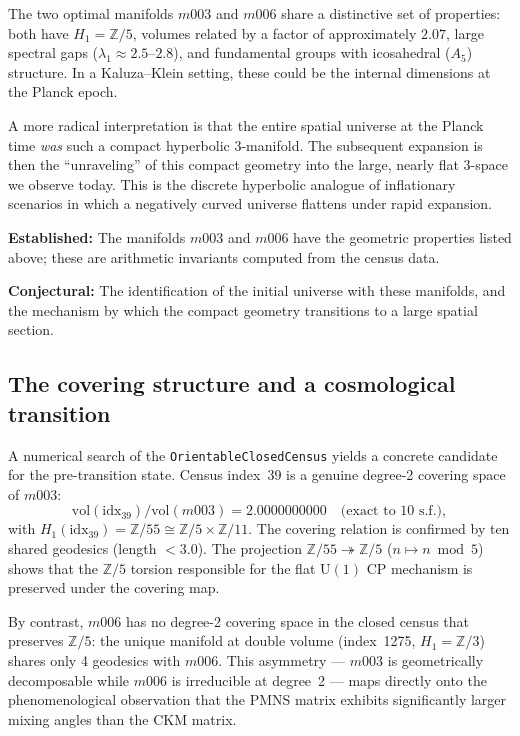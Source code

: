 \documentclass[12pt]{article}
\theoremstyle{definition}
\begin{document}
The two optimal manifolds $m003$ and $m006$ share a distinctive set
of properties: both have $H_1 = \mathbb{Z}/5$, volumes related by
a factor of approximately $2.07$, large spectral gaps
($\lambda_1 \approx 2.5$--$2.8$), and fundamental groups with
icosahedral ($A_5$) structure. In a Kaluza--Klein setting, these
could be the internal dimensions at the Planck epoch.

A more radical interpretation is that the entire spatial universe at
the Planck time \emph{was} such a compact hyperbolic 3-manifold. The
subsequent expansion is then the ``unraveling'' of this compact
geometry into the large, nearly flat 3-space we observe today. This
is the discrete hyperbolic analogue of inflationary scenarios in which
a negatively curved universe flattens under rapid expansion.

\textbf{Established:} The manifolds $m003$ and $m006$ have the
geometric properties listed above; these are arithmetic invariants
computed from the census data.

\textbf{Conjectural:} The identification of the initial universe with
these manifolds, and the mechanism by which the compact geometry
transitions to a large spatial section.

\subsection{The covering structure and a cosmological transition}
\label{sec:cover_cosm}

A numerical search of the \texttt{OrientableClosedCensus} yields
a concrete candidate for the pre-transition state. Census index~39
is a genuine degree-2 covering space of $m003$:
\[
  \mathrm{vol}(\text{idx}_{39}) / \mathrm{vol}(m003)
  = 2.0000000000 \quad \text{(exact to 10 s.f.)},
\]
with $H_1(\text{idx}_{39}) = \mathbb{Z}/55 \cong \mathbb{Z}/5
\times \mathbb{Z}/11$. The covering relation is confirmed by ten
shared geodesics (length $< 3.0$). The projection
$\mathbb{Z}/55 \twoheadrightarrow \mathbb{Z}/5$ ($n \mapsto n
\bmod 5$) shows that the $\mathbb{Z}/5$ torsion responsible for the
flat $\mathrm{U}(1)$ CP mechanism is preserved under the covering map.

By contrast, $m006$ has no degree-2 covering space in the closed
census that preserves $\mathbb{Z}/5$: the unique manifold at double
volume (index~1275, $H_1 = \mathbb{Z}/3$) shares only 4 geodesics with $m006$. This asymmetry --- $m003$ is geometrically
decomposable while $m006$ is irreducible at degree~2 --- maps
directly onto the phenomenological observation that the PMNS matrix
exhibits significantly larger mixing angles than the CKM matrix.
\end{document}
